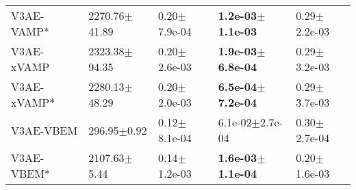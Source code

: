 \begin{tabular}{lllll}
V3AE-VAMP*             &            2270.76$\pm$41.89 &           0.20$\pm$7.9e-04 &  \textbf{1.2e-03$\pm$1.1e-03} &           0.29$\pm$2.2e-03 \\
V3AE-xVAMP             &            2323.38$\pm$94.35 &           0.20$\pm$2.6e-03 &  \textbf{1.9e-03$\pm$6.8e-04} &           0.29$\pm$3.2e-03 \\
V3AE-xVAMP*            &            2280.13$\pm$48.29 &           0.20$\pm$2.0e-03 &  \textbf{6.5e-04$\pm$7.2e-04} &           0.29$\pm$3.7e-03 \\
V3AE-VBEM              &              296.95$\pm$0.92 &           0.12$\pm$8.1e-04 &           6.1e-02$\pm$2.7e-04 &           0.30$\pm$2.7e-04 \\
V3AE-VBEM*             &             2107.63$\pm$5.44 &           0.14$\pm$1.2e-03 &  \textbf{1.6e-03$\pm$1.1e-04} &           0.20$\pm$1.6e-03 \\
\bottomrule
\end{tabular}

